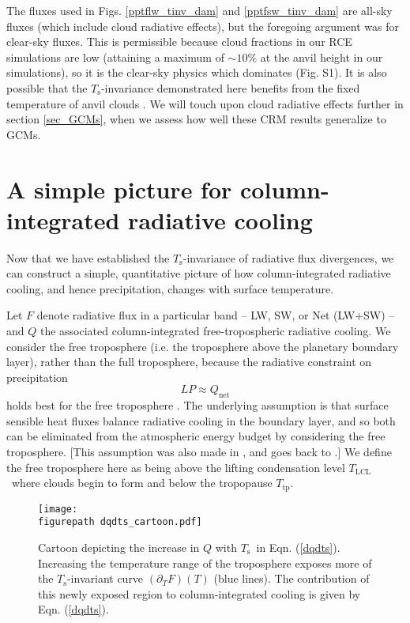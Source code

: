 \documentclass[9pt,twocolumn,twoside,lineno]{pnas-new}
\newcommand{\beqn}{\begin{equation}}
\newcommand{\eeqn}{\end{equation}}
\newcommand{\eqnref}[1]{(\ref{#1})}
\newcommand{\ppt}{\ensuremath{\partial_T}}
\newcommand{\Qnet}{\ensuremath{Q_\mathrm{net}}}
\newcommand{\Ts}{\ensuremath{T_\mathrm{s}}}
\newcommand{\Tlcl}{\ensuremath{T_\mathrm{LCL}}}
\newcommand{\Ttp}{\ensuremath{T_\mathrm{tp}}}
\newcommand{\figurepath}{../../figures/}
\begin{document}
The fluxes used in Figs.  \ref{pptflw_tinv_dam} and \ref{pptfsw_tinv_dam} are all-sky fluxes (which include cloud radiative effects), but the foregoing argument was for clear-sky fluxes. This is permissible because cloud fractions in our RCE simulations are low (attaining a maximum of $\sim 10 \%$ at the anvil height in our simulations), so it is the clear-sky physics which dominates (Fig. S1). It is also possible that the \Ts-invariance demonstrated here benefits from the fixed temperature of anvil clouds \cite{hartmann2002,kuang2007,harrop2012}. We will touch upon cloud radiative effects further in section \ref{sec_GCMs}, when we assess how well these CRM results generalize to GCMs.
 
		
\section{A simple picture for column-integrated radiative cooling} \label{sec_simple_Q}

Now that we have established  the \Ts-invariance of radiative flux divergences, we can construct a simple, quantitative picture of how column-integrated radiative cooling, and hence precipitation,  changes with surface temperature. 
	
	Let $F$ denote radiative flux in a particular band -- LW, SW, or Net (LW+SW) -- and $Q$ the associated column-integrated free-tropospheric radiative cooling. We consider  the free troposphere (i.e. the troposphere above the planetary boundary layer), rather than the full troposphere, because the radiative constraint on precipitation 
		\beqn
			LP \approx \Qnet
		\label{p_constraint}
		\eeqn
		 holds best for the free troposphere  \cite{ogorman2012}. The underlying assumption is that surface sensible heat fluxes balance radiative cooling in the boundary layer, and so both can be eliminated from the atmospheric energy budget by considering the free troposphere. [This assumption was also made in \cite{takahashi2009}, and goes back to \cite{betts1989}.] We define the free troposphere here as being above the lifting condensation level \Tlcl\ where clouds begin to form and below the tropopause \Ttp.
	
\begin{figure}[t]
	\begin{center}
			\texttt{[image: \\figurepath dqdts\_cartoon.pdf]}
		\caption{Cartoon depicting the increase in $Q$ with \Ts\ in Eqn. \eqnref{dqdts}. Increasing the temperature range of the troposphere  exposes more of the \Ts-invariant curve $(\ppt F)(T)$ (blue lines). The contribution  of this newly exposed region to column-integrated cooling is given by Eqn. \eqnref{dqdts}.
		\label{dqdts_cartoon}
		}
	\end{center}
\end{figure}
\end{document}
